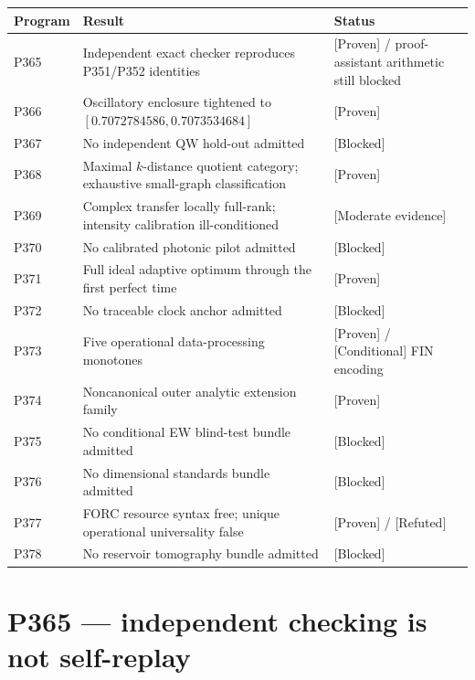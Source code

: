 \documentclass[11pt,a4paper,openany]{report}
\newcommand{\statusProven}{\textcolor{fingreen}{[Proven]}}
\newcommand{\statusModerate}{\textcolor{finviolet}{[Moderate evidence]}}
\newcommand{\statusRefuted}{\textcolor{finred}{[Refuted]}}
\begin{document}
\begin{center}
\begingroup\small
\setlength{\tabcolsep}{2.5pt}
\renewcommand{\arraystretch}{1.16}
\begin{longtable}{@{}p{}p{}p{}@{}}
\toprule
\textbf{Program} & \textbf{Result} & \textbf{Status} \\
\midrule
\endhead
P365 & Independent exact checker reproduces P351/\allowbreak{}P352 identities & \statusProven{} /\allowbreak{} proof-assistant arithmetic still blocked \\
P366 & Oscillatory enclosure tightened to \([0.7072784586,0.7073534684]\) & \statusProven{} \\
P367 & No independent QW hold-out admitted & [Blocked] \\
P368 & Maximal \(k\)-distance quotient category; exhaustive small-graph classification & \statusProven{} \\
P369 & Complex transfer locally full-rank; intensity calibration ill-conditioned & \statusModerate{} \\
P370 & No calibrated photonic pilot admitted & [Blocked] \\
P371 & Full ideal adaptive optimum through the first perfect time & \statusProven{} \\
P372 & No traceable clock anchor admitted & [Blocked] \\
P373 & Five operational data-processing monotones & \statusProven{} /\allowbreak{} [Conditional] FIN encoding \\
P374 & Noncanonical outer analytic extension family & \statusProven{} \\
P375 & No conditional EW blind-test bundle admitted & [Blocked] \\
P376 & No dimensional standards bundle admitted & [Blocked] \\
P377 & FORC resource syntax free; unique operational universality false & \statusProven{} /\allowbreak{} \statusRefuted{} \\
P378 & No reservoir tomography bundle admitted & [Blocked] \\
\bottomrule
\end{longtable}
\endgroup
\end{center}

\chapter{P365 --- independent checking is not self-replay}
\end{document}
